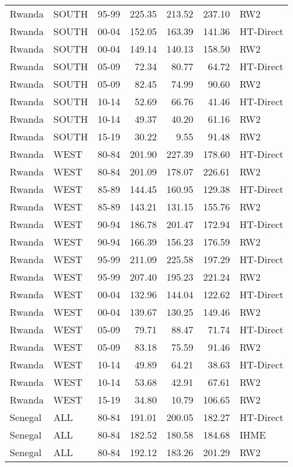 \begin{longtable}{lllrrrl}
  Rwanda & SOUTH & 95-99 & 225.35 & 213.52 & 237.10 & RW2 \\ 
  Rwanda & SOUTH & 00-04 & 152.05 & 163.39 & 141.36 & HT-Direct \\ 
  Rwanda & SOUTH & 00-04 & 149.14 & 140.13 & 158.50 & RW2 \\ 
  Rwanda & SOUTH & 05-09 & 72.34 & 80.77 & 64.72 & HT-Direct \\ 
  Rwanda & SOUTH & 05-09 & 82.45 & 74.99 & 90.60 & RW2 \\ 
  Rwanda & SOUTH & 10-14 & 52.69 & 66.76 & 41.46 & HT-Direct \\ 
  Rwanda & SOUTH & 10-14 & 49.37 & 40.20 & 61.16 & RW2 \\ 
  Rwanda & SOUTH & 15-19 & 30.22 & 9.55 & 91.48 & RW2 \\ 
  Rwanda & WEST & 80-84 & 201.90 & 227.39 & 178.60 & HT-Direct \\ 
  Rwanda & WEST & 80-84 & 201.09 & 178.07 & 226.61 & RW2 \\ 
  Rwanda & WEST & 85-89 & 144.45 & 160.95 & 129.38 & HT-Direct \\ 
  Rwanda & WEST & 85-89 & 143.21 & 131.15 & 155.76 & RW2 \\ 
  Rwanda & WEST & 90-94 & 186.78 & 201.47 & 172.94 & HT-Direct \\ 
  Rwanda & WEST & 90-94 & 166.39 & 156.23 & 176.59 & RW2 \\ 
  Rwanda & WEST & 95-99 & 211.09 & 225.58 & 197.29 & HT-Direct \\ 
  Rwanda & WEST & 95-99 & 207.40 & 195.23 & 221.24 & RW2 \\ 
  Rwanda & WEST & 00-04 & 132.96 & 144.04 & 122.62 & HT-Direct \\ 
  Rwanda & WEST & 00-04 & 139.67 & 130.25 & 149.46 & RW2 \\ 
  Rwanda & WEST & 05-09 & 79.71 & 88.47 & 71.74 & HT-Direct \\ 
  Rwanda & WEST & 05-09 & 83.18 & 75.59 & 91.46 & RW2 \\ 
  Rwanda & WEST & 10-14 & 49.89 & 64.21 & 38.63 & HT-Direct \\ 
  Rwanda & WEST & 10-14 & 53.68 & 42.91 & 67.61 & RW2 \\ 
  Rwanda & WEST & 15-19 & 34.80 & 10.79 & 106.65 & RW2 \\ 
  Senegal & ALL & 80-84 & 191.01 & 200.05 & 182.27 & HT-Direct \\ 
  Senegal & ALL & 80-84 & 182.52 & 180.58 & 184.68 & IHME \\ 
  Senegal & ALL & 80-84 & 192.12 & 183.26 & 201.29 & RW2 \\ 

\end{longtable}
